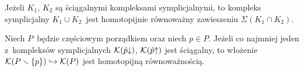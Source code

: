 \begin{lem}\label{lem-barmak_two_subcomplexes_lemma}
Jeżeli $K_1$, $K_2$ są ściągalnymi kompleksami symplicjalnymi, to  kompleks symplicjalny $K_1\cup K_2$~jest homotopijnie równoważny zawieszeniu $\Sigma(K_1\cap K_2)$.
\end{lem}

\begin{lem}\label{lem-punkt_posetu_ma_sciagalny_link_to_sdr_do_kompleksu_bez_tego_punktu}
Niech $P$~będzie częściowym porządkiem oraz niech $p\in P$. Jeżeli co najmniej jeden z~kompleksów symplicjalnych $\mathcal{K}(\hat{p}\mathord{\downarrow})$, $\mathcal{K}(\hat{p}\mathord{\uparrow})$ jest ściągalny, to włożenie $\mathcal{K}(P\smallsetminus \{p\})\hookrightarrow \mathcal{K}(P)$ jest homotopijną równoważnością. 
\end{lem}

